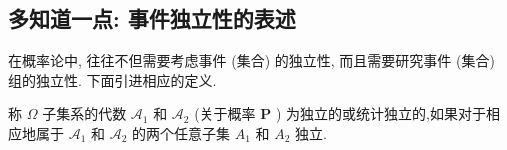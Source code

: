 \subsection*{多知道一点: 事件独立性的表述}
在概率论中, 往往不但需要考虑事件 (集合) 的独立性, 而且需要研究事件 (集合) 组的独立性. 下面引进相应的定义.
\begin{definition*}
    称 $\Omega$ 子集系的代数 $\mathscr{A}_1$ 和 $\mathscr{A}_2$ (关于概率 $\mathbf{P}$ ) 为独立的或统计独立的,如果对于相应地属于 $\mathscr{A}_1$ 和 $\mathscr{A}_2$ 的两个任意子集 $A_1$ 和 $A_2$ 独立.
\end{definition*}


